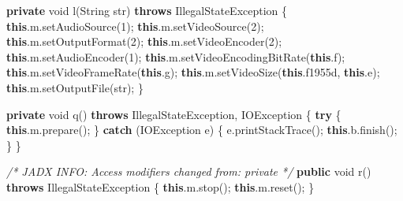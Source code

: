 \documentclass[
]{article}
\newenvironment{Shaded}{}{}
\newcommand{\BuiltInTok}[1]{\textcolor[rgb]{0.00,0.50,0.00}{#1}}
\newcommand{\CommentTok}[1]{\textcolor[rgb]{0.38,0.63,0.69}{\textit{#1}}}
\newcommand{\ControlFlowTok}[1]{\textcolor[rgb]{0.00,0.44,0.13}{\textbf{#1}}}
\newcommand{\DataTypeTok}[1]{\textcolor[rgb]{0.56,0.13,0.00}{#1}}
\newcommand{\DecValTok}[1]{\textcolor[rgb]{0.25,0.63,0.44}{#1}}
\newcommand{\FunctionTok}[1]{\textcolor[rgb]{0.02,0.16,0.49}{#1}}
\newcommand{\KeywordTok}[1]{\textcolor[rgb]{0.00,0.44,0.13}{\textbf{#1}}}
\newcommand{\NormalTok}[1]{#1}
\newcommand{\OperatorTok}[1]{\textcolor[rgb]{0.40,0.40,0.40}{#1}}
\begin{document}
\begin{Shaded}
\begin{Highlighting}[]
    \KeywordTok{private} \DataTypeTok{void} \FunctionTok{l}\OperatorTok{(}\BuiltInTok{String}\NormalTok{ str}\OperatorTok{)} \KeywordTok{throws} \BuiltInTok{IllegalStateException} \OperatorTok{\{}
        \KeywordTok{this}\OperatorTok{.}\FunctionTok{m}\OperatorTok{.}\FunctionTok{setAudioSource}\OperatorTok{(}\DecValTok{1}\OperatorTok{);}
        \KeywordTok{this}\OperatorTok{.}\FunctionTok{m}\OperatorTok{.}\FunctionTok{setVideoSource}\OperatorTok{(}\DecValTok{2}\OperatorTok{);}
        \KeywordTok{this}\OperatorTok{.}\FunctionTok{m}\OperatorTok{.}\FunctionTok{setOutputFormat}\OperatorTok{(}\DecValTok{2}\OperatorTok{);}
        \KeywordTok{this}\OperatorTok{.}\FunctionTok{m}\OperatorTok{.}\FunctionTok{setVideoEncoder}\OperatorTok{(}\DecValTok{2}\OperatorTok{);}
        \KeywordTok{this}\OperatorTok{.}\FunctionTok{m}\OperatorTok{.}\FunctionTok{setAudioEncoder}\OperatorTok{(}\DecValTok{1}\OperatorTok{);}
        \KeywordTok{this}\OperatorTok{.}\FunctionTok{m}\OperatorTok{.}\FunctionTok{setVideoEncodingBitRate}\OperatorTok{(}\KeywordTok{this}\OperatorTok{.}\FunctionTok{f}\OperatorTok{);}
        \KeywordTok{this}\OperatorTok{.}\FunctionTok{m}\OperatorTok{.}\FunctionTok{setVideoFrameRate}\OperatorTok{(}\KeywordTok{this}\OperatorTok{.}\FunctionTok{g}\OperatorTok{);}
        \KeywordTok{this}\OperatorTok{.}\FunctionTok{m}\OperatorTok{.}\FunctionTok{setVideoSize}\OperatorTok{(}\KeywordTok{this}\OperatorTok{.}\FunctionTok{f1955d}\OperatorTok{,} \KeywordTok{this}\OperatorTok{.}\FunctionTok{e}\OperatorTok{);}
        \KeywordTok{this}\OperatorTok{.}\FunctionTok{m}\OperatorTok{.}\FunctionTok{setOutputFile}\OperatorTok{(}\NormalTok{str}\OperatorTok{);}
    \OperatorTok{\}}

    \KeywordTok{private} \DataTypeTok{void} \FunctionTok{q}\OperatorTok{()} \KeywordTok{throws} \BuiltInTok{IllegalStateException}\OperatorTok{,} \BuiltInTok{IOException} \OperatorTok{\{}
        \ControlFlowTok{try} \OperatorTok{\{}
            \KeywordTok{this}\OperatorTok{.}\FunctionTok{m}\OperatorTok{.}\FunctionTok{prepare}\OperatorTok{();}
        \OperatorTok{\}} \ControlFlowTok{catch} \OperatorTok{(}\BuiltInTok{IOException}\NormalTok{ e}\OperatorTok{)} \OperatorTok{\{}
\NormalTok{            e}\OperatorTok{.}\FunctionTok{printStackTrace}\OperatorTok{();}
            \KeywordTok{this}\OperatorTok{.}\FunctionTok{b}\OperatorTok{.}\FunctionTok{finish}\OperatorTok{();}
        \OperatorTok{\}}
    \OperatorTok{\}}

    \CommentTok{/* JADX INFO: Access modifiers changed from: private */}
    \KeywordTok{public} \DataTypeTok{void} \FunctionTok{r}\OperatorTok{()} \KeywordTok{throws} \BuiltInTok{IllegalStateException} \OperatorTok{\{}
        \KeywordTok{this}\OperatorTok{.}\FunctionTok{m}\OperatorTok{.}\FunctionTok{stop}\OperatorTok{();}
        \KeywordTok{this}\OperatorTok{.}\FunctionTok{m}\OperatorTok{.}\FunctionTok{reset}\OperatorTok{();}
    \OperatorTok{\}}


\end{Highlighting}
\end{Shaded}
\end{document}
